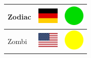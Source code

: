 \documentclass[12pt, a4paper, twoside]{report}
\begin{document}
\begin{center}
\begin{longtable}{|p{5cm}|p{2cm}|p{2cm}|}
 Zodiac                                                     & \includegraphics[width=1cm]{../4x3/de} &   \includegraphics[width=1cm]{../likes/y} \\ \hline
 Zombi                                                      & \includegraphics[width=1cm]{../4x3/us} &   \includegraphics[width=1cm]{../likes/m} \\ \hline
		\end{longtable}
	\end{center}
\end{document}
